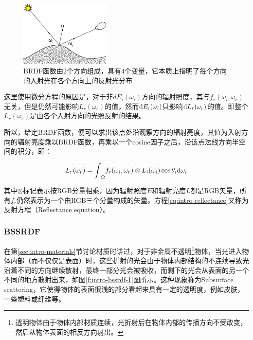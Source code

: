 \begin{figure}
\sidecaption
	\includegraphics[width=0.4\textwidth]{figures/intro/BRDF_Diagram}
	\caption{BRDF函数由2个方向组成，具有4个变量，它本质上指明了每个方向的入射光在各个方向上的反射光分布}
	\label{f:intro-brdf}
\end{figure}

这里使用微分方程的原因是，对于非$dE_i(\omega_i)$方向的辐射照度，其与$f_r(\omega_i,\omega_r)$无关，但是仍然可能影响$L_r(\omega_r)$的值，然而${\rm d}E_i(\omega_i)$只影响${\rm d}L_r(\omega_r)$的值。即整个$L_r(\omega_r)$是由各个入射方向的光照反射的结果。

所以，给定BRDF函数，便可以求出该点处沿观察方向的辐射亮度，其值为入射方向的辐射亮度乘以BRDF函数，再乘以一个cosine因子之后，沿该点法线方向半空间的积分，即：


\begin{equation}\label{eq:intro-reflectance}
	L_r(\omega_r)={\rm \int}_{\Omega}f_r(\omega_i,\omega_r)\otimes L_i(\omega_i)\cos\theta_i {\rm d}\omega_i
\end{equation}

\noindent 其中$\otimes$标记表示按RGB分量相乘，因为辐射照度$E$和辐射亮度$L$都是RGB矢量，所有$f_r$仍然表示为一个由RGB三个分量构成的矢量。方程\ref{eq:intro-reflectance}又称为反射方程（Reflectance equation）。




\subsubsection{BSSRDF}
在第\ref{sec:intro-materials}节讨论材质时讲过，对于非金属不透明\footnote{透明物体由于物体内部材质连续，光折射后在物体内部的传播方向不受改变，然后从物体表面的相反方向射出。}物体，当光进入物体内部（而不仅仅是表面）时，这些折射的光会由于物体内部结构的不连续导致光沿着不同的方向继续散射，最终一部分光会被吸收，而剩下的光会从表面的另一个不同的地方散射出来，如图\ref{f:intro-bssrdf-1}图所示。这种现象称为Subsurface scattering，它使得物体的表面很浅的部分看起来具有一定的透明度，例如皮肤，一些塑料或纤维等。

